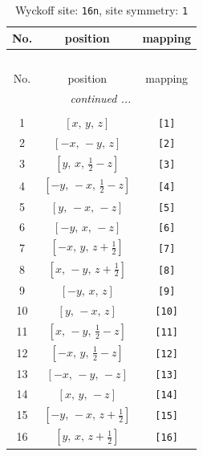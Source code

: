 \documentclass[fleqn,8pt]{jsarticle}
\begin{document}
\begin{longtable}{ccc}
\caption{Wyckoff site: {\tt 16n}, site symmetry: {\tt 1}}
 \\
 \hline \hline
No. & position & mapping \\ \hline \endfirsthead

\multicolumn{2}{l}{\tablename\ \thetable{}} \\
 \hline \hline
No. & position & mapping \\ \hline \endhead

 \hline \hline
\multicolumn{2}{r}{\footnotesize\it continued ...} \\ \endfoot

 \hline \hline
\multicolumn{2}{r}{} \\ \endlastfoot

1 & $\left[ x,\, y,\, z \right]$ & {\tt [1]} \\ \hline
2 & $\left[ - x,\, - y,\, z \right]$ & {\tt [2]} \\ \hline
3 & $\left[ y,\, x,\, \frac{1}{2} - z \right]$ & {\tt [3]} \\ \hline
4 & $\left[ - y,\, - x,\, \frac{1}{2} - z \right]$ & {\tt [4]} \\ \hline
5 & $\left[ y,\, - x,\, - z \right]$ & {\tt [5]} \\ \hline
6 & $\left[ - y,\, x,\, - z \right]$ & {\tt [6]} \\ \hline
7 & $\left[ - x,\, y,\, z + \frac{1}{2} \right]$ & {\tt [7]} \\ \hline
8 & $\left[ x,\, - y,\, z + \frac{1}{2} \right]$ & {\tt [8]} \\ \hline
9 & $\left[ - y,\, x,\, z \right]$ & {\tt [9]} \\ \hline
10 & $\left[ y,\, - x,\, z \right]$ & {\tt [10]} \\ \hline
11 & $\left[ x,\, - y,\, \frac{1}{2} - z \right]$ & {\tt [11]} \\ \hline
12 & $\left[ - x,\, y,\, \frac{1}{2} - z \right]$ & {\tt [12]} \\ \hline
13 & $\left[ - x,\, - y,\, - z \right]$ & {\tt [13]} \\ \hline
14 & $\left[ x,\, y,\, - z \right]$ & {\tt [14]} \\ \hline
15 & $\left[ - y,\, - x,\, z + \frac{1}{2} \right]$ & {\tt [15]} \\ \hline
16 & $\left[ y,\, x,\, z + \frac{1}{2} \right]$ & {\tt [16]} \\
\end{longtable}
\end{document}
